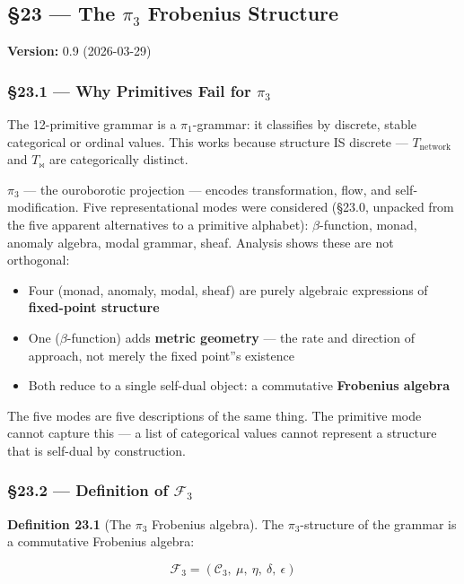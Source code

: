 \documentclass[12pt,a4paper]{article}
\newcommand{\pilcrow}{\S}
\begin{document}
\subsection{\pilcrow{}23 --- The $\pi_3$ Frobenius Structure}

\textbf{Version:} 0.9 (2026-03-29)

\subsubsection{\pilcrow{}23.1 --- Why Primitives Fail for $\pi_3$}

The 12-primitive grammar is a $\pi_1$-grammar: it classifies by discrete, stable categorical or ordinal values. This works because structure IS discrete --- $T_\text{network}$ and $T_{\bowtie}$ are categorically distinct.

$\pi_3$ --- the ouroborotic projection --- encodes transformation, flow, and self-modification. Five representational modes were considered (\pilcrow{}23.0, unpacked from the five apparent alternatives to a primitive alphabet): $\beta$-function, monad, anomaly algebra, modal grammar, sheaf. Analysis shows these are not orthogonal:

\begin{itemize}
    \item Four (monad, anomaly, modal, sheaf) are purely algebraic expressions of \textbf{fixed-point structure}
    \item One ($\beta$-function) adds \textbf{metric geometry} --- the rate and direction of approach, not merely the fixed point''s existence
    \item Both reduce to a single self-dual object: a commutative \textbf{Frobenius algebra}
\end{itemize}

The five modes are five descriptions of the same thing. The primitive mode cannot capture this --- a list of categorical values cannot represent a structure that is self-dual by construction.

\subsubsection{\pilcrow{}23.2 --- Definition of $\mathcal{F}_3$}

\textbf{Definition 23.1} (The $\pi_3$ Frobenius algebra). The $\pi_3$-structure of the grammar is a commutative Frobenius algebra:

\[\mathcal{F}_3 = (\mathcal{C}_3,\ \mu,\ \eta,\ \delta,\ \epsilon)\]
\end{document}
